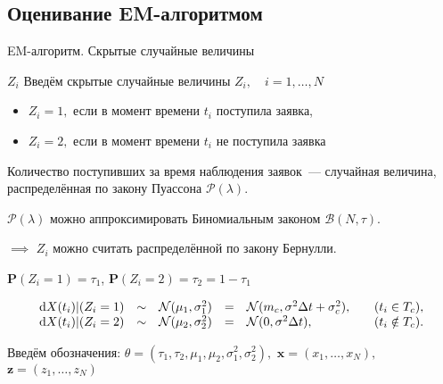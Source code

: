 \documentclass[utf8]{beamer}
\begin{document}
\subsection[EM-алгоритм]{Оценивание EM-алгоритмом}
\begin{frame}{EM-алгоритм. Скрытые случайные величины}
\begin{block}{$Z_i$}
  Введём скрытые случайные величины $Z_i, \quad i=1,\ldots,N$
  \begin{itemize}
    \item $Z_i = 1,$ если в момент времени $t_i$ поступила заявка,
    \item $Z_i = 2,$ если в момент времени $t_i$ не поступила заявка
  \end{itemize}
  Количество поступивших за время наблюдения заявок~--- случайная величина, 
  распределённая по закону Пуассона $\mathcal{P}(\lambda).$

  $\mathcal{P}(\lambda)$ можно аппроксимировать Биномиальным законом 
  $\mathcal{B}(N, \tau).$

  $\implies$ $Z_i$ можно считать распределённой по закону Бернулли.

  $\mathbf{P}(Z_i=1) = \tau_1$, $\mathbf{P}(Z_i=2) = \tau_2 = 1 - \tau_1$
\end{block}

$$
\begin{array}{rclcll}
\dif X(t_i) \vert (Z_i = 1) &\sim& \mathcal{N}(\mu_1, \sigma_1^2) &=& 
  \mathcal{N}(m_c, \sigma^2 \Delta t + \sigma_c^2), &
  \quad (t_i \in T_c), \\
\dif X(t_i) \vert (Z_i = 2) &\sim& \mathcal{N}(\mu_2, \sigma_2^2) &=& 
  \mathcal{N}(0, \sigma^2 \Delta t), &
  \quad (t_i \notin T_c).
\end{array}
$$

Введём обозначения: 
$\theta = (\tau_1, \tau_2, \mu_1, \mu_2, \sigma_1^2, \sigma_2^2),$
$\mathbf{x} = (x_1, \ldots, x_N),$
$\mathbf{z} = (z_1, \ldots, z_N)$
\end{frame}
\end{document}
